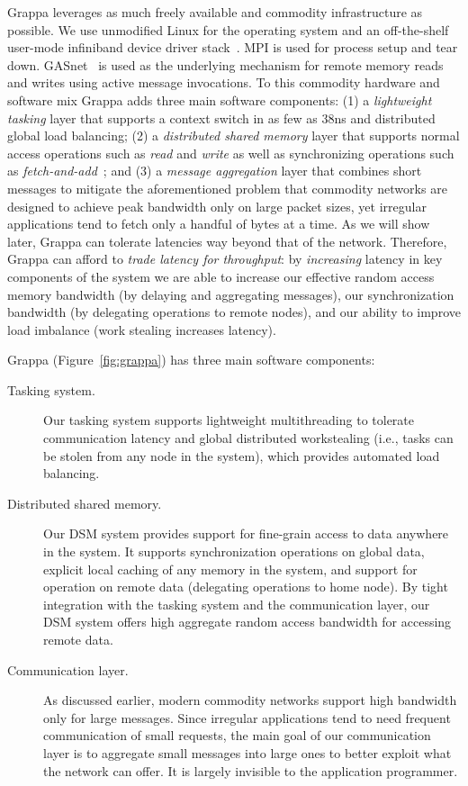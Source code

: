 Grappa leverages as much freely available and commodity infrastructure as
possible. We use unmodified Linux for the operating system and an
off-the-shelf user-mode infiniband device driver stack~\cite{OFED}. MPI is
used for process setup and tear down. GASnet~\cite{gasnet} is used as the
underlying mechanism for remote memory reads and writes using active message
invocations. To this commodity hardware and software mix Grappa adds three
main software components: (1) a \emph{lightweight tasking\/} layer that supports
a context switch in as few as 38ns and distributed global load balancing; (2)
a \emph{distributed shared memory\/} layer that supports normal access operations
such as \emph{read\/} and \emph{write\/} as well as synchronizing operations such as \emph{fetch-and-add\/}~\cite{fetchandadd}; and (3) a \emph{message aggregation\/} layer
that combines short messages to mitigate the aforementioned problem that
commodity networks are designed to achieve peak bandwidth only on large packet
sizes, yet irregular applications tend to fetch only a handful of bytes at a
time. As we will show later, Grappa can tolerate latencies way beyond that of
the network. Therefore, Grappa can afford to \emph{trade latency for
throughput\/}: by {\em increasing\/} latency in key components of the system we
are able to increase our effective random access memory bandwidth (by delaying and aggregating messages), our synchronization bandwidth (by delegating operations
to remote nodes), and our ability to improve load imbalance (work stealing
increases latency).

Grappa (Figure~\ref{fig:grappa}) has three main software components:
\begin{description}

\item [Tasking system.] Our tasking system supports lightweight
multithreading to tolerate communication latency and global distributed
workstealing (i.e., tasks can be stolen from any node in the system), which
provides automated load balancing.

\item[Distributed shared memory.] Our DSM system provides support for
fine-grain access to data anywhere in the system. It supports synchronization
operations on global data, explicit local caching of any memory in the system,
and support for operation on remote data (delegating operations to home node).
By tight integration with the tasking system and the
communication layer, our DSM system offers high aggregate random
access bandwidth for accessing remote data.

\item[Communication layer.] As discussed earlier, modern commodity networks
support high bandwidth only for large messages. Since irregular applications
tend to need frequent communication of small requests, the main goal of our
communication layer is to aggregate small messages into large ones to better
exploit what the network can offer. It is largely invisible to the application
programmer.

\end{description}

